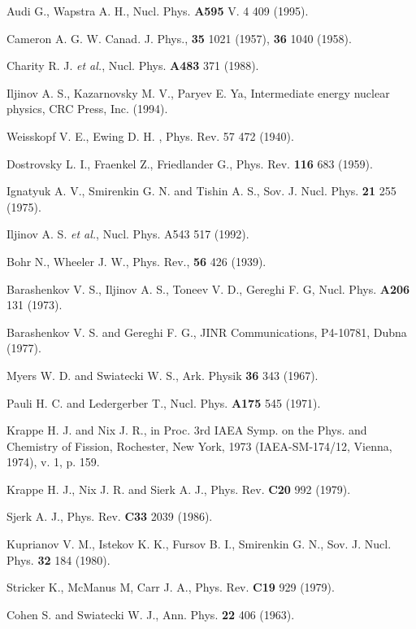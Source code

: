 \begin{thebibliography}{599}

 Audi G., Wapstra A. H., Nucl. Phys. {\bf A595} V. 4 409 (1995).

  Cameron A. G. W. Canad. J. Phys., {\bf 35} 1021 (1957), 
{\bf 36} 1040 (1958).

 Charity R. J. {\it et al.}, 
Nucl. Phys. {\bf A483} 371 (1988). 

 Iljinov A. S., Kazarnovsky M. V., Paryev E. Ya, 
Intermediate energy nuclear physics, CRC Press, Inc. (1994).

 Weisskopf V. E., Ewing D. H. , Phys. Rev. {57} 472 (1940).

 Dostrovsky L. I., Fraenkel Z., Friedlander G., 
Phys. Rev. {\bf 116} 
683 (1959).

  Ignatyuk A. V., Smirenkin G. N. and
 Tishin A. S., Sov. J. Nucl. Phys. {\bf 21} 255 (1975).
 
 Iljinov A. S. {\it et al.}, Nucl. Phys. {A543} 517
(1992).

 Bohr N., Wheeler J. W., Phys. Rev., {\bf 56} 426 (1939).

 Barashenkov V. S., Iljinov A. S., Toneev V. D., 
Gereghi F. G, Nucl. Phys. {\bf A206} 131 (1973).

 Barashenkov V. S. and Gereghi F. G., JINR Communications, 
P4-10781, Dubna (1977).

 Myers W. D. and Swiatecki W. S., Ark. Physik {\bf 36} 343
(1967).

 Pauli H. C. and Ledergerber T., Nucl. Phys. {\bf A175} 545
(1971).

 Krappe H. J. and Nix J. R., in Proc. 3rd IAEA Symp. on the Phys.
and Chemistry of Fission, Rochester, New York, 1973 (IAEA-SM-174/12, Vienna,
1974), v. 1, p. 159.

 Krappe H. J., Nix J. R. and Sierk A. J., Phys. Rev. 
{\bf C20} 992 (1979).

 Sjerk A. J., Phys. Rev. {\bf C33} 2039 (1986).

 Kuprianov V. M., Istekov K. K., Fursov B. I., Smirenkin G. N., 
Sov. J. Nucl. Phys. {\bf 32} 184 (1980).

Stricker K., McManus M, Carr J. A., Phys. Rev. {\bf C19} 929
(1979).

 Cohen S. and Swiatecki W. J., Ann. Phys. {\bf 22} 406 (1963).


\end{thebibliography}
